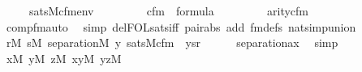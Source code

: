\begin{isabellebody}
\ \ \ \ {\isasymlongleftrightarrow}\ sats{\isacharparenleft}{\kern0pt}M{\isacharcomma}{\kern0pt}cfm{\isacharparenleft}{\kern0pt}{}{\isacharcomma}{\kern0pt}{}{\isacharcomma}{\kern0pt}{}{\isacharparenright}{\kern0pt}{\isacharcomma}{\kern0pt}env{\isacharparenright}{\kern0pt}{\isachardoublequoteclose}\isanewline
\ \ \ \ \isanewline
\ \ \ \ {\isachardoublequoteopen}cfm{\isacharparenleft}{\kern0pt}{}{\isacharcomma}{\kern0pt}{}{\isacharcomma}{\kern0pt}{}{\isacharparenright}{\kern0pt}\ {\isasymin}\ formula{\isachardoublequoteclose}\isanewline
\ \ \ \ \isanewline
\ \ \ \ {\isachardoublequoteopen}arity{\isacharparenleft}{\kern0pt}cfm{\isacharparenleft}{\kern0pt}{}{\isacharcomma}{\kern0pt}{}{\isacharcomma}{\kern0pt}{}{\isacharparenright}{\kern0pt}{\isacharparenright}{\kern0pt}\ {\isacharequal}{\kern0pt}\ {}{\isachardoublequoteclose}\isanewline
\ \ \ \ \isamarkupfalse%
\ comp{\isacharunderscore}{\kern0pt}fm{\isacharunderscore}{\kern0pt}auto\ \isamarkupfalse%
\ {\isacharparenleft}{\kern0pt}simp\ del{\isacharcolon}{\kern0pt}FOL{\isacharunderscore}{\kern0pt}sats{\isacharunderscore}{\kern0pt}iff\ pair{\isacharunderscore}{\kern0pt}abs\ add{\isacharcolon}{\kern0pt}\ fm{\isacharunderscore}{\kern0pt}defs\ nat{\isacharunderscore}{\kern0pt}simp{\isacharunderscore}{\kern0pt}union{\isacharparenright}{\kern0pt}\isanewline
\ \ \isamarkupfalse%
\isanewline
\ \ \isamarkupfalse%
\ {\isachardoublequoteopen}{\isasymforall}r{\isasymin}M{\isachardot}{\kern0pt}\ {\isasymforall}s{\isasymin}M{\isachardot}{\kern0pt}\ separation{\isacharparenleft}{\kern0pt}{\isacharhash}{\kern0pt}{\isacharhash}{\kern0pt}M{\isacharcomma}{\kern0pt}\ {\isasymlambda}y{\isachardot}{\kern0pt}\ sats{\isacharparenleft}{\kern0pt}M{\isacharcomma}{\kern0pt}cfm{\isacharparenleft}{\kern0pt}{}{\isacharcomma}{\kern0pt}{}{\isacharcomma}{\kern0pt}{}{\isacharparenright}{\kern0pt}\ {\isacharcomma}{\kern0pt}\ {\isacharbrackleft}{\kern0pt}y{\isacharcomma}{\kern0pt}s{\isacharcomma}{\kern0pt}r{\isacharbrackright}{\kern0pt}{\isacharparenright}{\kern0pt}{\isacharparenright}{\kern0pt}{\isachardoublequoteclose}\isanewline
\ \ \ \ \isamarkupfalse%
\ separation{\isacharunderscore}{\kern0pt}ax\ \isamarkupfalse%
\ simp\isanewline
\ \ \isamarkupfalse%
\isanewline
\ \ \isamarkupfalse%
\ {\isachardoublequoteopen}{\isacharparenleft}{\kern0pt}{\isasymexists}x{\isasymin}M{\isachardot}{\kern0pt}\ {\isasymexists}y{\isasymin}M{\isachardot}{\kern0pt}\ {\isasymexists}z{\isasymin}M{\isachardot}{\kern0pt}\ {\isasymexists}xy{\isasymin}M{\isachardot}{\kern0pt}\ {\isasymexists}yz{\isasymin}M{\isachardot}{\kern0pt}\isanewline

\end{isabellebody}
